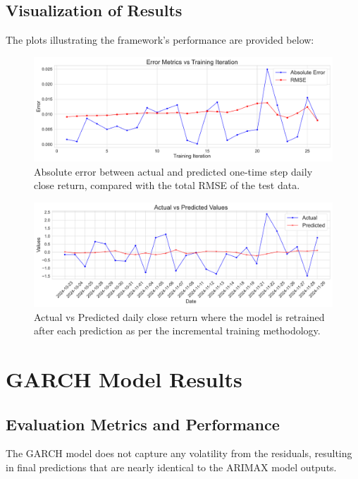\subsection{Visualization of Results}
The plots illustrating the framework's performance are provided below:

\begin{figure}[h!]
    \centering
    \includegraphics[width=\textwidth]{Images/absolute_error_vs_rmse.pdf}
    \caption{Absolute error between actual and predicted one-time step daily close return, compared with the total RMSE of the test data.}
    \label{fig:absolute_error_rmse}
\end{figure}

\begin{figure}[h!]
    \centering
    \includegraphics[width=\textwidth]{Images/actual_vs_predicted_returns.pdf}
    \caption{Actual vs Predicted daily close return where the model is retrained after each prediction as per the incremental training methodology.}
    \label{fig:actual_vs_predicted}
\end{figure}

\section{GARCH Model Results}

\subsection{Evaluation Metrics and Performance}

The GARCH model does not capture any volatility from the residuals, resulting in final predictions that are nearly identical to the ARIMAX model outputs.

